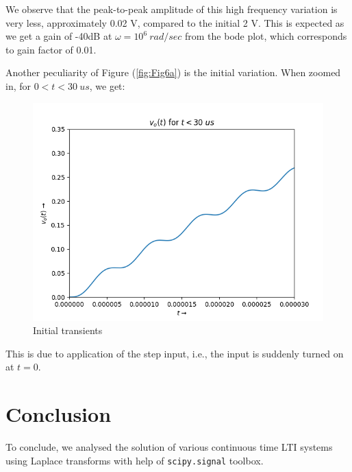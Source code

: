 \documentclass[11pt, a4paper, twoside]{article}
\begin{document}
    We observe that the peak-to-peak amplitude of this high frequency variation is very less, approximately 0.02 V, compared to the initial 2 V. This is expected as we get a gain of -40dB at $\omega=10^6\ rad/sec$ from the bode plot, which corresponds to gain factor of 0.01.

    Another peculiarity of Figure (\ref{fig:Fig6a}) is the initial variation. When zoomed in, for $0<t<30\ us$, we get:
    \begin{figure}[H]
        \centering
        \includegraphics[scale=0.7]{Fig 6(b).png}
        \caption{Initial transients}
        \label{fig:Fig6b}
    \end{figure}

    This is due to application of the step input, i.e., the input is suddenly turned on at $t=0$.
\section{Conclusion}
To conclude, we analysed the solution of various continuous time LTI systems using Laplace transforms with help of \texttt{scipy.signal} toolbox.
\end{document}
